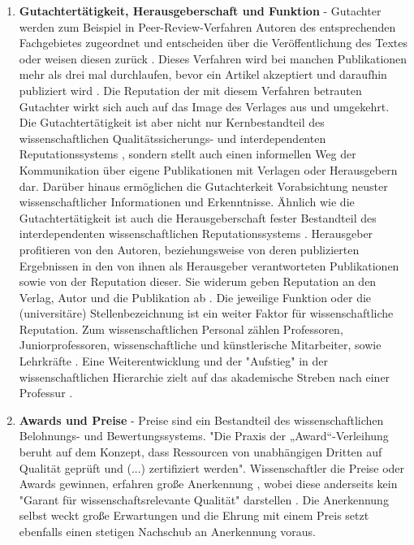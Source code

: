 \begin{enumerate}
\item \textbf{Gutachtertätigkeit, Herausgeberschaft und Funktion} - Gutachter werden zum Beispiel in Peer-Review-Verfahren Autoren des entsprechenden Fachgebietes zugeordnet und entscheiden über die Veröffentlichung des Textes oder weisen diesen zurück \cite{Frey_2005}. Dieses Verfahren wird bei manchen Publikationen mehr als drei mal durchlaufen, bevor ein Artikel akzeptiert und daraufhin publiziert wird \cite{Frey_2005}. Die Reputation der mit diesem Verfahren betrauten Gutachter wirkt sich auch auf das Image des Verlages aus und umgekehrt. Die Gutachtertätigkeit ist aber nicht nur Kernbestandteil des wissenschaftlichen Qualitätssicherungs- und interdependenten Reputationssystems \cite{Frey_2005} \cite{mueller_2009_peerreview}, sondern stellt auch einen informellen Weg der Kommunikation über eigene Publikationen mit Verlagen oder Herausgebern dar. Darüber hinaus ermöglichen die Gutachterkeit Vorabsichtung neuster wissenschaftlicher Informationen und Erkenntnisse. Ähnlich wie die Gutachtertätigkeit ist auch die Herausgeberschaft fester Bestandteil des interdependenten wissenschaftlichen Reputationssystems \cite{Frey_2005}. Herausgeber profitieren von den Autoren, beziehungsweise von deren publizierten Ergebnissen in den von ihnen als Herausgeber verantworteten Publikationen sowie von der Reputation dieser. Sie widerum geben Reputation an den Verlag, Autor und die Publikation ab \cite{suchen}. Die jeweilige Funktion oder die (universitäre) Stellenbezeichnung ist ein weiter Faktor für wissenschaftliche Reputation. Zum wissenschaftlichen Personal zählen Professoren, Juniorprofessoren, wissenschaftliche und künstlerische Mitarbeiter, sowie Lehrkräfte \cite{erhardt_2011_hochschulen}. Eine Weiterentwicklung und der "Aufstieg" in der wissenschaftlichen Hierarchie zielt auf das akademische Streben nach einer Professur \cite{Klecha_2008}.
\item \textbf{Awards und Preise} - Preise sind ein Bestandteil des wissenschaftlichen Belohnungs- und Bewertungssystems. "Die Praxis der „Award“-Verleihung beruht auf dem Konzept, dass Ressourcen von unabhängigen Dritten auf Qualität geprüft und (...) zertifiziert werden". Wissenschaftler die Preise oder Awards gewinnen, erfahren große Anerkennung \cite{suchen}, wobei diese anderseits kein "Garant für wissenschaftsrelevante Qualität" darstellen \cite{bargheer_2002_qualitatskriterien}. Die Anerkennung selbst weckt große Erwartungen und die Ehrung mit einem Preis setzt ebenfalls einen stetigen Nachschub an Anerkennung voraus\cite{suchen}. 
\end{enumerate}

